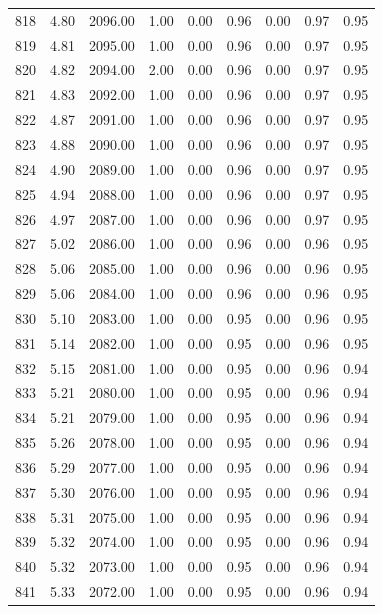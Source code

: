 \documentclass{article}\usepackage[]{graphicx}\usepackage[]{color}
\begin{document}
\begin{longtable}{rrrrrrrrr}
  818 & 4.80 & 2096.00 & 1.00 & 0.00 & 0.96 & 0.00 & 0.97 & 0.95 \\ 
  819 & 4.81 & 2095.00 & 1.00 & 0.00 & 0.96 & 0.00 & 0.97 & 0.95 \\ 
  820 & 4.82 & 2094.00 & 2.00 & 0.00 & 0.96 & 0.00 & 0.97 & 0.95 \\ 
  821 & 4.83 & 2092.00 & 1.00 & 0.00 & 0.96 & 0.00 & 0.97 & 0.95 \\ 
  822 & 4.87 & 2091.00 & 1.00 & 0.00 & 0.96 & 0.00 & 0.97 & 0.95 \\ 
  823 & 4.88 & 2090.00 & 1.00 & 0.00 & 0.96 & 0.00 & 0.97 & 0.95 \\ 
  824 & 4.90 & 2089.00 & 1.00 & 0.00 & 0.96 & 0.00 & 0.97 & 0.95 \\ 
  825 & 4.94 & 2088.00 & 1.00 & 0.00 & 0.96 & 0.00 & 0.97 & 0.95 \\ 
  826 & 4.97 & 2087.00 & 1.00 & 0.00 & 0.96 & 0.00 & 0.97 & 0.95 \\ 
  827 & 5.02 & 2086.00 & 1.00 & 0.00 & 0.96 & 0.00 & 0.96 & 0.95 \\ 
  828 & 5.06 & 2085.00 & 1.00 & 0.00 & 0.96 & 0.00 & 0.96 & 0.95 \\ 
  829 & 5.06 & 2084.00 & 1.00 & 0.00 & 0.96 & 0.00 & 0.96 & 0.95 \\ 
  830 & 5.10 & 2083.00 & 1.00 & 0.00 & 0.95 & 0.00 & 0.96 & 0.95 \\ 
  831 & 5.14 & 2082.00 & 1.00 & 0.00 & 0.95 & 0.00 & 0.96 & 0.95 \\ 
  832 & 5.15 & 2081.00 & 1.00 & 0.00 & 0.95 & 0.00 & 0.96 & 0.94 \\ 
  833 & 5.21 & 2080.00 & 1.00 & 0.00 & 0.95 & 0.00 & 0.96 & 0.94 \\ 
  834 & 5.21 & 2079.00 & 1.00 & 0.00 & 0.95 & 0.00 & 0.96 & 0.94 \\ 
  835 & 5.26 & 2078.00 & 1.00 & 0.00 & 0.95 & 0.00 & 0.96 & 0.94 \\ 
  836 & 5.29 & 2077.00 & 1.00 & 0.00 & 0.95 & 0.00 & 0.96 & 0.94 \\ 
  837 & 5.30 & 2076.00 & 1.00 & 0.00 & 0.95 & 0.00 & 0.96 & 0.94 \\ 
  838 & 5.31 & 2075.00 & 1.00 & 0.00 & 0.95 & 0.00 & 0.96 & 0.94 \\ 
  839 & 5.32 & 2074.00 & 1.00 & 0.00 & 0.95 & 0.00 & 0.96 & 0.94 \\ 
  840 & 5.32 & 2073.00 & 1.00 & 0.00 & 0.95 & 0.00 & 0.96 & 0.94 \\ 
  841 & 5.33 & 2072.00 & 1.00 & 0.00 & 0.95 & 0.00 & 0.96 & 0.94 \\ 

\end{longtable}
\end{document}
